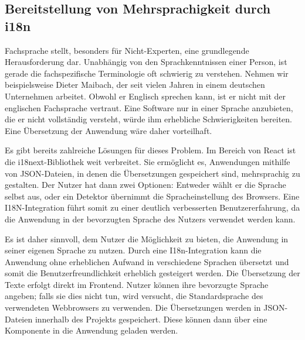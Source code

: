 \subsection{Bereitstellung von Mehrsprachigkeit durch i18n}
Fachsprache stellt, besonders für Nicht-Experten, eine grundlegende Herausforderung dar. Unabhängig von den Sprachkenntnissen einer Person, ist gerade die 
fachspezifische Terminologie oft schwierig zu verstehen. Nehmen wir beispielsweise Dieter Maibach, der seit vielen Jahren in einem deutschen Unternehmen arbeitet. 
Obwohl er Englisch sprechen kann, ist er nicht mit der englischen Fachsprache vertraut. Eine Software nur in einer Sprache anzubieten, die er nicht vollständig versteht, 
würde ihm erhebliche Schwierigkeiten bereiten. Eine Übersetzung der Anwendung wäre daher vorteilhaft.

Es gibt bereits zahlreiche Lösungen für dieses Problem. Im Bereich von React ist die i18next-Bibliothek weit verbreitet. Sie ermöglicht es, Anwendungen 
mithilfe von JSON-Dateien, in denen die Übersetzungen gespeichert sind, mehrsprachig zu gestalten. Der Nutzer hat dann zwei Optionen: Entweder wählt er die Sprache 
selbst aus, oder ein Detektor übernimmt die Spracheinstellung des Browsers. Eine I18N-Integration führt somit zu einer deutlich verbesserten Benutzererfahrung, da die 
Anwendung in der bevorzugten Sprache des Nutzers verwendet werden kann.

Es ist daher sinnvoll, dem Nutzer die Möglichkeit zu bieten, die Anwendung in seiner eigenen Sprache zu nutzen. Durch eine I18n-Integration kann die 
Anwendung ohne erheblichen Aufwand in verschiedene Sprachen übersetzt und somit die Benutzerfreundlichkeit erheblich gesteigert werden. Die Übersetzung der Texte 
erfolgt direkt im Frontend. Nutzer können ihre bevorzugte Sprache angeben; falls sie dies nicht tun, wird versucht, die Standardsprache des verwendeten Webbrowsers zu 
verwenden. Die Übersetzungen werden in JSON-Dateien innerhalb des Projekts gespeichert. Diese können dann über eine Komponente in die Anwendung geladen werden.

